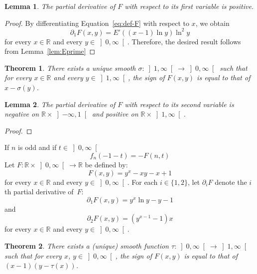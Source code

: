 \documentclass[12pt]{article}
\newcommand{\bR}{\mathbb{R}}
\newcommand{\gtint}[1]{\left] #1, \infty \right[}
\newcommand{\ltint}[1]{\left]- \infty, #1 \right[}
\newtheorem{theorem}{Theorem}
\newtheorem{lemma}{Lemma}
\begin{document}
\begin{lemma}
  The partial derivative of $F$ with respect to its first variable is positive.
\end{lemma}

\begin{proof}
  By differentiating Equation~\eqref{eq:def-F} with respect to $x$, we obtain
  $$
  \partial_1 F(x, y) = E'((x - 1) \ln y) \ln^2 y 
  $$
  for every $x \in \bR$ and every $y \in \gtint{0}$.
  Therefore, the desired result follows from Lemma~\ref{lem:Eprime}
\end{proof} 

\begin{theorem}
  There exists a unique smooth $\sigma \colon \gtint{1} \to \gtint{0}$ such that
  for every $x \in \bR$ and every $y \in \gtint{1}$, the sign of $F(x, y)$ is equal to that of $x - \sigma(y)$.
\end{theorem}

\begin{lemma}
  The partial derivative of $F$ with respect to its second variable is
  negative on $\bR \times \ltint{1}$
  and
  positive on $\bR \times \gtint{1}$.
\end{lemma} 

\begin{proof}
\end{proof} 



If $n$ is odd and if $t \in \gtint{0}$
$$
f_n(- 1 - t)
= - F(n, t) 
$$
Let $F\colon \bR \times \gtint{0}\to \bR$ be defined by:
$$
F(x, y) = y^x - x y - x + 1
$$
for every $x \in \bR$ and every $y \in \gtint{0}$.
For each $i \in \{ 1, 2 \}$, let $\partial_i F$ denote the $i$th partial derivative of~$F$:
$$
\partial_1 F(x, y) = y^x \ln y - y - 1 
$$
and
\begin{equation} \label{eq:dF-dy}
\partial_2 F(x, y) =  (y^{x - 1}  -  1) x
\end{equation} 
for every $x \in \bR$ and every $y \in \gtint{0}$.

\begin{theorem}
  There exists a (unique) smooth function $\tau\colon \gtint{0} \to \gtint{1}$ such that
  for every $x$, $y \in \gtint{0}$,
  the sign of $F(x, y)$ is equal to that of $(x - 1)(y - \tau(x))$.
\end{theorem}
\end{document}
